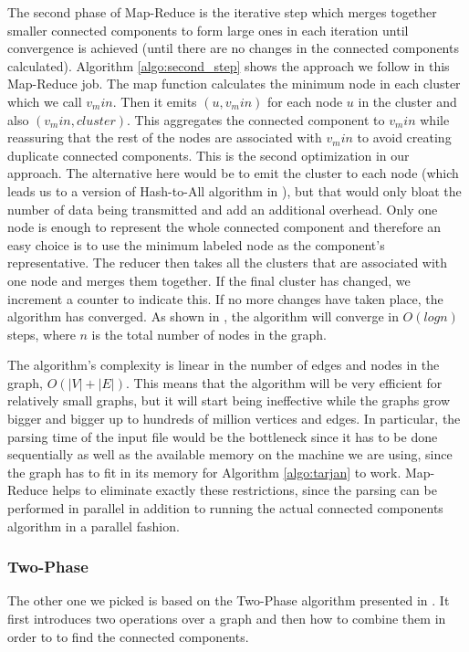 The second phase of Map-Reduce is the iterative step which merges together smaller connected components to form large ones in each iteration until convergence is achieved (\ie until there are no changes in the connected components calculated). Algorithm \ref{algo:second_step} shows the approach we follow in this Map-Reduce job. The map function calculates the minimum node in each cluster which we call $v_min$. Then it emits $(u, v_min)$ for each node $u$ in the cluster and also $(v_min, cluster)$. This aggregates the connected component to $v_min$ while reassuring that the rest of the nodes are associated with $v_min$ to avoid creating duplicate connected components. This is the second optimization in our approach. The alternative here would be to emit the cluster to each node (which leads us to a version of Hash-to-All algorithm in \cite{rastogi}), but that would only bloat the number of data being transmitted and add an additional overhead. Only one node is enough to represent the whole connected component and therefore an easy choice is to use the minimum labeled node as the component's representative. The reducer then takes all the clusters that are associated with one node and merges them together. If the final cluster has changed, we increment a counter to indicate this. If no more changes have taken place, the algorithm has converged. As shown in \cite{rastogi}, the algorithm will converge in $O(logn)$ steps, where $n$ is the total number of nodes in the graph.

The algorithm's complexity is linear in the number of edges and nodes in the graph, \ie $O(|V| + |E|)$. This means that the algorithm will be very efficient for relatively small graphs, but it will start being ineffective while the graphs grow bigger and bigger up to hundreds of million vertices and edges. In particular, the parsing time of the input file would be the bottleneck since it has to be done sequentially as well as the available memory on the machine we are using, since the graph has to fit in its memory for Algorithm \ref{algo:tarjan} to work. Map-Reduce helps to eliminate exactly these restrictions, since the parsing can be performed in parallel in addition to running the actual connected components algorithm in a parallel fashion.

\subsubsection{Two-Phase}

The other one we picked is based on the Two-Phase algorithm presented in \cite{kiveris}. It first introduces two operations over a graph and then how to combine them in order to to find the connected components.

